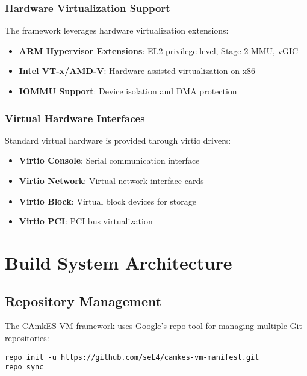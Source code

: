 \documentclass[11pt,a4paper]{article}
\begin{document}
\subsubsection{Hardware Virtualization Support}

The framework leverages hardware virtualization extensions:

\begin{itemize}
\item \textbf{ARM Hypervisor Extensions}: EL2 privilege level, Stage-2 MMU, vGIC
\item \textbf{Intel VT-x/AMD-V}: Hardware-assisted virtualization on x86
\item \textbf{IOMMU Support}: Device isolation and DMA protection
\end{itemize}

\subsubsection{Virtual Hardware Interfaces}

Standard virtual hardware is provided through virtio drivers:

\begin{itemize}
\item \textbf{Virtio Console}: Serial communication interface
\item \textbf{Virtio Network}: Virtual network interface cards
\item \textbf{Virtio Block}: Virtual block devices for storage
\item \textbf{Virtio PCI}: PCI bus virtualization
\end{itemize}

\section{Build System Architecture}

\subsection{Repository Management}

The CAmkES VM framework uses Google's repo tool for managing multiple Git repositories:

\begin{lstlisting}[caption=Repository Initialization]
repo init -u https://github.com/seL4/camkes-vm-manifest.git
repo sync
\end{lstlisting}
\end{document}
